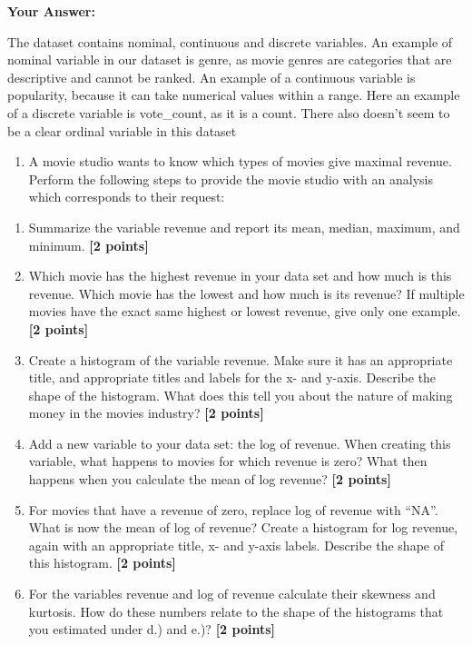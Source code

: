 \documentclass[
]{article}
\providecommand{\tightlist}{%
  \setlength{\itemsep}{0pt}\setlength{\parskip}{0pt}}
\begin{document}
\textbf{Your Answer:}

The dataset contains nominal, continuous and discrete variables. An
example of nominal variable in our dataset is genre, as movie genres are
categories that are descriptive and cannot be ranked. An example of a
continuous variable is popularity, because it can take numerical values
within a range. Here an example of a discrete variable is vote\_count,
as it is a count. There also doesn't seem to be a clear ordinal variable
in this dataset

\begin{enumerate}
\def\labelenumi{\arabic{enumi}.}
\setcounter{enumi}{2}
\tightlist
\item
  A movie studio wants to know which types of movies give maximal
  revenue. Perform the following steps to provide the movie studio with
  an analysis which corresponds to their request:
\end{enumerate}

\begin{enumerate}
\def\labelenumi{\alph{enumi}.}
\tightlist
\item
  Summarize the variable revenue and report its mean, median, maximum,
  and minimum. \textbf{[2 points]}
\item
  Which movie has the highest revenue in your data set and how much is
  this revenue. Which movie has the lowest and how much is its revenue?
  If multiple movies have the exact same highest or lowest revenue, give
  only one example. \textbf{[2 points]}
\item
  Create a histogram of the variable revenue. Make sure it has an
  appropriate title, and appropriate titles and labels for the x- and
  y-axis. Describe the shape of the histogram. What does this tell you
  about the nature of making money in the movies industry?
  \textbf{[2 points]}
\item
  Add a new variable to your data set: the log of revenue. When creating
  this variable, what happens to movies for which revenue is zero? What
  then happens when you calculate the mean of log revenue?
  \textbf{[2 points]}
\item
  For movies that have a revenue of zero, replace log of revenue with
  ``NA''. What is now the mean of log of revenue? Create a histogram for
  log revenue, again with an appropriate title, x- and y-axis labels.
  Describe the shape of this histogram. \textbf{[2 points]}
\item
  For the variables revenue and log of revenue calculate their skewness
  and kurtosis. How do these numbers relate to the shape of the
  histograms that you estimated under d.) and e.)? \textbf{[2 points]}
\end{enumerate}
\end{document}
